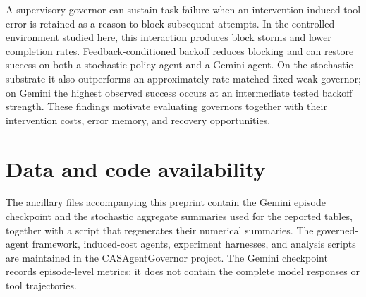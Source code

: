 \documentclass[11pt]{article}
\begin{document}
A supervisory governor can sustain task failure when an intervention-induced
tool error is retained as a reason to block subsequent attempts. In the
controlled environment studied here, this interaction produces block storms
and lower completion rates. Feedback-conditioned backoff reduces blocking and
can restore success on both a stochastic-policy agent and a Gemini agent.
On the stochastic substrate it also outperforms an approximately rate-matched
fixed weak governor; on Gemini the highest observed success occurs at an
intermediate tested backoff strength. These findings motivate evaluating
governors together with their intervention costs, error memory, and recovery
opportunities.

\section*{Data and code availability}
The ancillary files accompanying this preprint contain the Gemini episode
checkpoint and the stochastic aggregate summaries used for the reported
tables, together with a script that regenerates their numerical summaries.
The governed-agent framework, induced-cost agents, experiment harnesses, and
analysis scripts are maintained in the CASAgentGovernor project. The Gemini
checkpoint records episode-level metrics; it does not contain the complete
model responses or tool trajectories.
\end{document}
